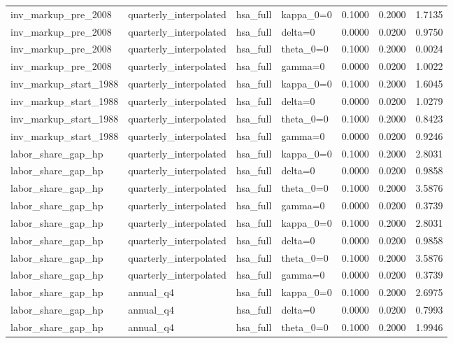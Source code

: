 \begin{tabular}{llllrrr}
inv\_markup\_pre\_2008 & quarterly\_interpolated & hsa\_full & kappa\_0=0 & 0.1000 & 0.2000 & 1.7135 \\
inv\_markup\_pre\_2008 & quarterly\_interpolated & hsa\_full & delta=0 & 0.0000 & 0.0200 & 0.9750 \\
inv\_markup\_pre\_2008 & quarterly\_interpolated & hsa\_full & theta\_0=0 & 0.1000 & 0.2000 & 0.0024 \\
inv\_markup\_pre\_2008 & quarterly\_interpolated & hsa\_full & gamma=0 & 0.0000 & 0.0200 & 1.0022 \\
inv\_markup\_start\_1988 & quarterly\_interpolated & hsa\_full & kappa\_0=0 & 0.1000 & 0.2000 & 1.6045 \\
inv\_markup\_start\_1988 & quarterly\_interpolated & hsa\_full & delta=0 & 0.0000 & 0.0200 & 1.0279 \\
inv\_markup\_start\_1988 & quarterly\_interpolated & hsa\_full & theta\_0=0 & 0.1000 & 0.2000 & 0.8423 \\
inv\_markup\_start\_1988 & quarterly\_interpolated & hsa\_full & gamma=0 & 0.0000 & 0.0200 & 0.9246 \\
labor\_share\_gap\_hp & quarterly\_interpolated & hsa\_full & kappa\_0=0 & 0.1000 & 0.2000 & 2.8031 \\
labor\_share\_gap\_hp & quarterly\_interpolated & hsa\_full & delta=0 & 0.0000 & 0.0200 & 0.9858 \\
labor\_share\_gap\_hp & quarterly\_interpolated & hsa\_full & theta\_0=0 & 0.1000 & 0.2000 & 3.5876 \\
labor\_share\_gap\_hp & quarterly\_interpolated & hsa\_full & gamma=0 & 0.0000 & 0.0200 & 0.3739 \\
labor\_share\_gap\_hp & quarterly\_interpolated & hsa\_full & kappa\_0=0 & 0.1000 & 0.2000 & 2.8031 \\
labor\_share\_gap\_hp & quarterly\_interpolated & hsa\_full & delta=0 & 0.0000 & 0.0200 & 0.9858 \\
labor\_share\_gap\_hp & quarterly\_interpolated & hsa\_full & theta\_0=0 & 0.1000 & 0.2000 & 3.5876 \\
labor\_share\_gap\_hp & quarterly\_interpolated & hsa\_full & gamma=0 & 0.0000 & 0.0200 & 0.3739 \\
labor\_share\_gap\_hp & annual\_q4 & hsa\_full & kappa\_0=0 & 0.1000 & 0.2000 & 2.6975 \\
labor\_share\_gap\_hp & annual\_q4 & hsa\_full & delta=0 & 0.0000 & 0.0200 & 0.7993 \\
labor\_share\_gap\_hp & annual\_q4 & hsa\_full & theta\_0=0 & 0.1000 & 0.2000 & 1.9946 \\

\end{tabular}

